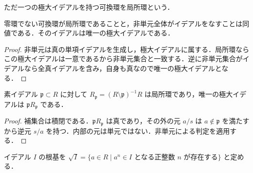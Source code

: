 \begin{defn}[局所環]
ただ一つの極大イデアルを持つ可換環を局所環という．
\end{defn}
\begin{prop}[局所環の非単元]
零環でない可換環が局所環であることと，非単元全体がイデアルをなすことは同値である．そのイデアルは唯一の極大イデアルである．
\end{prop}
\begin{proof}
非単元は真の単項イデアルを生成し，極大イデアルに属する．局所環ならこの極大イデアルは一意であるから非単元集合と一致する．逆に非単元集合がイデアルなら全真イデアルを含み，自身も真なので唯一の極大イデアルとなる．
\end{proof}
\begin{prop}[素イデアルにおける局所化]
素イデアル $\mathfrak p\subset R$ に対して $R_{\mathfrak p}=(R\setminus\mathfrak p)^{-1}R$ は局所環であり，唯一の極大イデアルは $\mathfrak p R_{\mathfrak p}$ である．
\end{prop}
\begin{proof}
補集合は積閉である．$\mathfrak p R_{\mathfrak p}$ は真であり，その外の元 $a/s$ は $a\notin\mathfrak p$ を満たすから逆元 $s/a$ を持つ．内部の元は単元ではない．非単元による判定を適用する．
\end{proof}
\begin{defn}[イデアルの根基]
イデアル $I$ の根基を $\sqrt I=\{a\in R\mid a^n\in I\text{ となる正整数 }n\text{ が存在する}\}$ と定める．
\end{defn}
